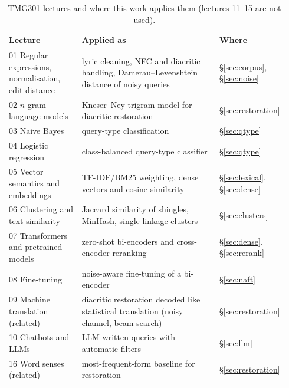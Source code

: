 \documentclass[11pt]{article}
\begin{document}
\begin{table}[h]
\centering\small
\caption{TMG301 lectures and where this work applies them (lectures 11--15 are not used).}\label{tab:tmg}
\begin{tabular}{@{}p{0.27\linewidth}p{0.55\linewidth}p{0.12\linewidth}@{}}
\toprule
Lecture & Applied as & Where \\
\midrule
01 Regular expressions, normalisation, edit distance & lyric cleaning, NFC and diacritic handling, Damerau--Levenshtein distance of noisy queries & \S\ref{sec:corpus}, \S\ref{sec:noise} \\
02 $n$-gram language models & Kneser--Ney trigram model for diacritic restoration & \S\ref{sec:restoration} \\
03 Naive Bayes & query-type classification & \S\ref{sec:qtype} \\
04 Logistic regression & class-balanced query-type classifier & \S\ref{sec:qtype} \\
05 Vector semantics and embeddings & TF-IDF/BM25 weighting, dense vectors and cosine similarity & \S\ref{sec:lexical}, \S\ref{sec:dense} \\
06 Clustering and text similarity & Jaccard similarity of shingles, MinHash, single-linkage clusters & \S\ref{sec:clusters} \\
07 Transformers and pretrained models & zero-shot bi-encoders and cross-encoder reranking & \S\ref{sec:dense}, \S\ref{sec:rerank} \\
08 Fine-tuning & noise-aware fine-tuning of a bi-encoder & \S\ref{sec:naft} \\
09 Machine translation (related) & diacritic restoration decoded like statistical translation (noisy channel, beam search) & \S\ref{sec:restoration} \\
10 Chatbots and LLMs & LLM-written queries with automatic filters & \S\ref{sec:llm} \\
16 Word senses (related) & most-frequent-form baseline for restoration & \S\ref{sec:restoration} \\
\bottomrule
\end{tabular}
\end{table}
\fi
\end{document}
